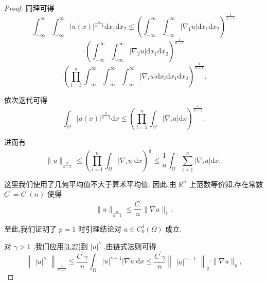 \documentclass[lang=cn,newtx,10pt,scheme=chinese,thmcnt=chapter]{elegantbook}
\newcommand{\dif}{\mathrm{d}}
\begin{document}
\begin{proof}
同理可得
\begin{equation*}
{\int }_{-\infty }^{\infty }{\int }_{-\infty }^{\infty }{\left| u\left( x\right) \right| }^{\frac{n}{n - 1}}\dif x_1\dif x_2 \leqslant  {\left( {\int }_{-\infty }^{\infty }{\int }_{-\infty }^{\infty }\left| {\nabla }_{1}u\right| \dif x_1\dif x_2\right) }^{\frac{1}{n - 1}}
\end{equation*}
\begin{equation*}
\cdot  {\left( {\int }_{-\infty }^{\infty }{\int }_{-\infty }^{\infty }\left| {\nabla }_{2}u\right| \dif x_1\dif x_2\right) }^{\frac{1}{n - 1}}
\end{equation*}
\begin{equation*}
\cdot  {\left( \mathop{\prod }\limits_{{i = 3}}^{n}{\int }_{-\infty }^{\infty }{\int }_{-\infty }^{\infty }{\int }_{-\infty }^{\infty }\left| {\nabla }_{i}u\right| \dif x_i\dif x_1\dif x_2\right) }^{\frac{1}{n - 1}}.
\end{equation*}

依次迭代可得
\begin{equation*}
{\int }_{\Omega }{\left| u\left( x\right) \right| }^{\frac{n}{n - 1}}{\dif x} \leqslant  {\left( \mathop{\prod }\limits_{{i = 1}}^{n}{\int }_{\Omega }\left| {\nabla }_{i}u\right| \dif x\right) }^{\frac{1}{n - 1}}.
\end{equation*}

进而有
\begin{equation*}
\parallel u{\parallel }_{\frac{n}{n - 1}} \leqslant  {\left( \mathop{\prod }\limits_{{i = 1}}^{n}{\int }_{\Omega }\left| {\nabla }_{i}u\right| \dif x\right) }^{\frac{1}{n}} \leqslant  \frac{1}{n}{\int }_{\Omega }\mathop{\sum }\limits_{{i = 1}}^{n}\left| {{\nabla }_{i}u}\right| {\dif x},
\end{equation*}

这里我们使用了几何平均值不大于算术平均值. 因此,由 \({\mathbb{R}}^{n}\) 上范数等价知,存在常数 \({C}^{\prime } = {C}^{\prime }\left( n\right)\) 使得
\begin{equation}
\parallel u{\parallel }_{\frac{n}{n - 1}} \leqslant  \frac{{C}^{\prime }}{n}\parallel \nabla u{\parallel }_{1}. \label{3.27}
\end{equation}

至此,我们证明了 \(p = 1\) 时引理结论对 \(u \in  {C}_{0}^{1}\left( \Omega \right)\) 成立.

对 \(\gamma  > 1\) ,我们应用\ref{3.27}到 \({\left| u\right| }^{\gamma }\) ,由链式法则可得
\begin{equation}
{\begin{Vmatrix}{\left| u\right| }^{\gamma }\end{Vmatrix}}_{\frac{n}{n - 1}} \leqslant  \frac{{C}^{\prime }\gamma }{n}{\int }_{\Omega }{\left| u\right| }^{\gamma  - 1}\left| {\nabla u}\right| {\dif x}
\leqslant  \frac{{C}^{\prime }\gamma }{n}{\begin{Vmatrix}{\left| u\right| }^{\gamma  - 1}\end{Vmatrix}}_{q} \cdot  \parallel \nabla u{\parallel }_{p}, \label{3.28}
\end{equation}


\end{proof}
\end{document}
